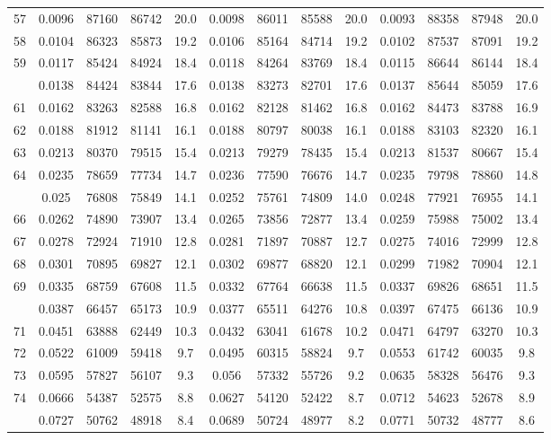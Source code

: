 \documentclass[
  14pt,
]{article}
\begin{document}
\begin{longtable}[t]{lcccccccccccc}
57 & 0.0096 & 87160 & 86742 & 20.0 & 0.0098 & 86011 & 85588 & 20.0 & 0.0093 & 88358 & 87948 & 20.0\\
58 & 0.0104 & 86323 & 85873 & 19.2 & 0.0106 & 85164 & 84714 & 19.2 & 0.0102 & 87537 & 87091 & 19.2\\
59 & 0.0117 & 85424 & 84924 & 18.4 & 0.0118 & 84264 & 83769 & 18.4 & 0.0115 & 86644 & 86144 & 18.4\\
\addlinespace
60 & 0.0138 & 84424 & 83844 & 17.6 & 0.0138 & 83273 & 82701 & 17.6 & 0.0137 & 85644 & 85059 & 17.6\\
61 & 0.0162 & 83263 & 82588 & 16.8 & 0.0162 & 82128 & 81462 & 16.8 & 0.0162 & 84473 & 83788 & 16.9\\
62 & 0.0188 & 81912 & 81141 & 16.1 & 0.0188 & 80797 & 80038 & 16.1 & 0.0188 & 83103 & 82320 & 16.1\\
63 & 0.0213 & 80370 & 79515 & 15.4 & 0.0213 & 79279 & 78435 & 15.4 & 0.0213 & 81537 & 80667 & 15.4\\
64 & 0.0235 & 78659 & 77734 & 14.7 & 0.0236 & 77590 & 76676 & 14.7 & 0.0235 & 79798 & 78860 & 14.8\\
\addlinespace
65 & 0.025 & 76808 & 75849 & 14.1 & 0.0252 & 75761 & 74809 & 14.0 & 0.0248 & 77921 & 76955 & 14.1\\
66 & 0.0262 & 74890 & 73907 & 13.4 & 0.0265 & 73856 & 72877 & 13.4 & 0.0259 & 75988 & 75002 & 13.4\\
67 & 0.0278 & 72924 & 71910 & 12.8 & 0.0281 & 71897 & 70887 & 12.7 & 0.0275 & 74016 & 72999 & 12.8\\
68 & 0.0301 & 70895 & 69827 & 12.1 & 0.0302 & 69877 & 68820 & 12.1 & 0.0299 & 71982 & 70904 & 12.1\\
69 & 0.0335 & 68759 & 67608 & 11.5 & 0.0332 & 67764 & 66638 & 11.5 & 0.0337 & 69826 & 68651 & 11.5\\
\addlinespace
70 & 0.0387 & 66457 & 65173 & 10.9 & 0.0377 & 65511 & 64276 & 10.8 & 0.0397 & 67475 & 66136 & 10.9\\
71 & 0.0451 & 63888 & 62449 & 10.3 & 0.0432 & 63041 & 61678 & 10.2 & 0.0471 & 64797 & 63270 & 10.3\\
72 & 0.0522 & 61009 & 59418 & 9.7 & 0.0495 & 60315 & 58824 & 9.7 & 0.0553 & 61742 & 60035 & 9.8\\
73 & 0.0595 & 57827 & 56107 & 9.3 & 0.056 & 57332 & 55726 & 9.2 & 0.0635 & 58328 & 56476 & 9.3\\
74 & 0.0666 & 54387 & 52575 & 8.8 & 0.0627 & 54120 & 52422 & 8.7 & 0.0712 & 54623 & 52678 & 8.9\\
\addlinespace
75 & 0.0727 & 50762 & 48918 & 8.4 & 0.0689 & 50724 & 48977 & 8.2 & 0.0771 & 50732 & 48777 & 8.6\\

\end{longtable}
\end{document}
